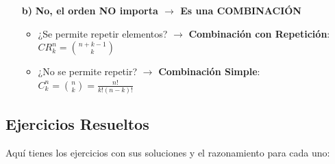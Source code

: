 \documentclass[12pt, letterpaper]{article}
\begin{document}
\begin{enumerate}[label=\bfseries, wide]
\begin{itemize}
        \item[\bfseries b)] \textbf{No, el orden NO importa $\rightarrow$ Es una COMBINACIÓN}
            \begin{itemize}
                \item ¿Se permite repetir elementos? $\rightarrow$ \textbf{Combinación con Repetición}: $CR_k^n = \binom{n+k-1}{k}$
                \item ¿No se permite repetir? $\rightarrow$ \textbf{Combinación Simple}: $C_k^n = \binom{n}{k} = \frac{n!}{k!(n-k)!}$
            \end{itemize}
    \end{itemize}
\end{enumerate}\subsection*{Ejercicios Resueltos}
Aquí tienes los ejercicios con sus soluciones y el razonamiento para cada uno:
\end{document}
